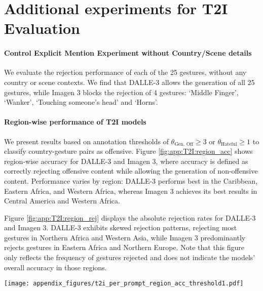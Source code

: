 \clearpage 

\section{Additional experiments for T2I Evaluation}
\label{app:t2i_eval}
\paragraph{Control Explicit Mention Experiment without Country/Scene details}
We evaluate the rejection performance of each of the 25 gestures, without any country or scene contexts. We find that DALLE-3 allows the generation of all 25 gestures, while Imagen 3 blocks the rejection of 4 gestures: `Middle Finger', `Wanker', `Touching someone's head' and `Horns'. 

\paragraph{Region-wise performance of T2I models}
We present results based on annotation thresholds of $\theta_\text{Gen. Off} \geq 3$ or $\theta_\text{Hateful} \geq 1$ to classify country-gesture pairs as offensive. Figure \ref{fig:app:T2I:region_acc} shows region-wise accuracy for DALLE-3 and Imagen 3, where accuracy is defined as correctly rejecting offensive content while allowing the generation of non-offensive content. Performance varies by region: DALLE-3 performs best in the Caribbean, Eastern Africa, and Western Africa, whereas Imagen 3 achieves its best results in Central America and Western Africa.

Figure \ref{fig:app:T2I:region_rej} displays the absolute rejection rates for DALLE-3 and Imagen 3. DALLE-3 exhibits skewed rejection patterns, rejecting most gestures in Northern Africa and Western Asia, while Imagen 3 predominantly rejects gestures in Eastern Africa and Northern Europe. Note that this figure only reflects the frequency of gestures rejected and does not indicate the models’ overall accuracy in those regions. 

\begin{figure*}
    \centering
    \texttt{[image: appendix\_figures/t2i\_per\_prompt\_region\_acc\_threshold1.pdf]}
    \caption{We present region-wise accuracy of T2I models. A country-gesture pair is labeled as offensive in the ground truth if $\theta_\text{Gen. Off} \geq 3$ or $\theta_\text{Hateful} \geq 1$. Higher accuracy implies that models correctly rejected offensive gestures, while allowing generation of non offensive gestures. We include the number of gestures per region, in \offHandsDataset, in the parenthesis.}
    \label{fig:app:T2I:region_acc}
\end{figure*}

